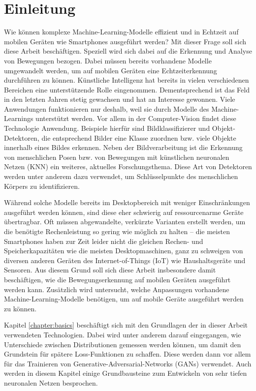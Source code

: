 \chapter{Einleitung}
Wie können komplexe Machine-Learning-Modelle effizient und in Echtzeit auf
mobilen Geräten wie Smartphones ausgeführt werden? Mit dieser Frage soll sich
diese Arbeit beschäftigen. Speziell wird sich dabei auf die Erkennung und
Analyse von Bewegungen bezogen. Dabei müssen bereits vorhandene Modelle
umgewandelt werden, um auf mobilen Geräten eine Echtzeiterkennung durchführen zu
können. Künstliche Intelligenz hat bereits in vielen verschiedenen Bereichen
eine unterstützende Rolle eingenommen.  Dementsprechend ist das Feld in den
letzten Jahren stetig gewachsen und hat an Interesse gewonnen. Viele Anwendungen
funktionieren nur deshalb, weil sie durch Modelle des Machine-Learnings
unterstützt werden. Vor allem in der Computer-Vision findet diese Technologie
Anwendung. Beispiele hierfür sind Bildklassifizierer und Objekt-Detektoren, die
entsprechend Bilder eine Klasse zuordnen bzw. viele Objekte innerhalb eines
Bildes erkennen. Neben der Bildverarbeitung ist die Erkennung von menschlichen
Posen bzw. von Bewegungen mit künstlichen neuronalen Netzen (KNN) ein weiteres,
aktuelles Forschungsthema. Diese Art von Detektoren werden unter anderem dazu
verwendet, um Schlüs\-sel\-punkte des menschlichen Körpers zu identifizieren.

Während solche Modelle bereits im Desktopbereich mit weniger Einschränkungen
ausgeführt werden können, sind diese eher schwierig auf ressourcenarme Geräte
übertragbar. Oft müssen abgewandelte, verkürzte Varianten erstellt werden, um
die benötigte Rechenleistung so gering wie möglich zu halten -- die meisten
Smartphones haben zur Zeit leider nicht die gleichen Rechen- und
Speicherkapazitäten wie die meisten Desktopmaschinen, ganz zu schweigen von
diversen anderen Geräten des Internet-of-Things (IoT) wie Haushaltsgeräte und
Sensoren. Aus diesem Grund soll sich diese Arbeit insbesondere damit
beschäftigen, wie die Bewegungserkennung auf mobilen Geräten ausgeführt werden
kann. Zusätzlich wird untersucht, welche Anpassungen vorhandene
Machine-Learning-Modelle benötigen, um auf mobile Geräte ausgeführt werden zu
können.

Kapitel \ref{chapter:basics} beschäftigt sich mit den Grundlagen der in dieser
Arbeit verwendeten Technologien. Dabei wird unter anderem darauf eingegangen,
wie Unterschiede zwischen Distributionen gemessen werden können, um damit den
Grundstein für spätere Loss-Funktionen zu schaffen. Diese werden dann vor allem
für das Trainieren von Generative-Adversarial-Networks (GANs) verwendet. Auch
werden in diesem Kapitel einige Grundbausteine zum Entwickeln von sehr tiefen
neuronalen Netzen besprochen.

